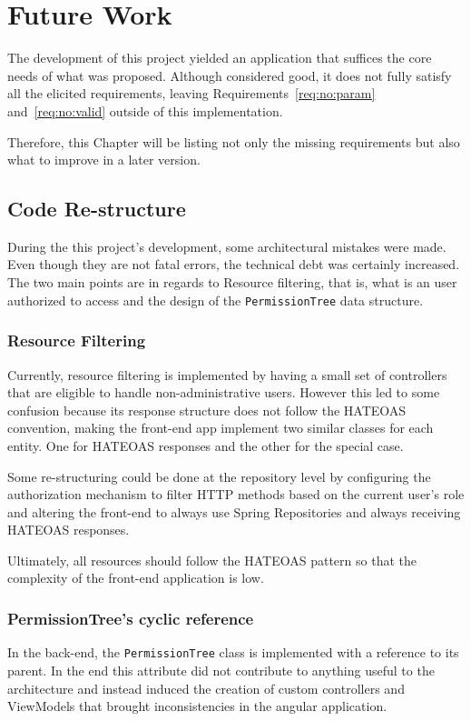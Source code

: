 \chapter{Future Work}\label{chap:future}
The development of this project yielded an application that suffices the core needs of what was proposed. Although considered good, it does not fully satisfy all the elicited requirements, leaving Requirements~\ref{req:no:param} and~\ref{req:no:valid} outside of this implementation.

Therefore, this Chapter will be listing not only the missing requirements but also what to improve in a later version.

\section{Code Re-structure}
During the this project's development, some architectural mistakes were made. Even though they are not fatal errors, the technical debt was certainly increased. The two main points are in regards to Resource filtering, that is, what is an user authorized to access and the design of the \texttt{PermissionTree} data structure. 

\subsection{Resource Filtering}
Currently, resource filtering is implemented by having a small set of controllers that are eligible to handle non-administrative users. However this led to some confusion because its response structure does not follow the \gls{HATEOAS} convention, making the front-end app implement two similar classes for each entity. One for \gls{HATEOAS} responses and the other for the special case.

Some re-structuring could be done at the repository level by configuring the authorization mechanism to filter \gls{HTTP} methods based on the current user's role and altering the front-end to always use Spring Repositories and always receiving \gls{HATEOAS} responses.

Ultimately, all resources should follow the \gls{HATEOAS} pattern so that the complexity of the front-end application is low.

\subsection{PermissionTree's cyclic reference}
In the back-end, the \texttt{PermissionTree} class is implemented with a reference to its parent. In the end this attribute did not contribute to anything useful to the architecture and instead induced the creation of custom controllers and ViewModels that brought inconsistencies in the angular application.

